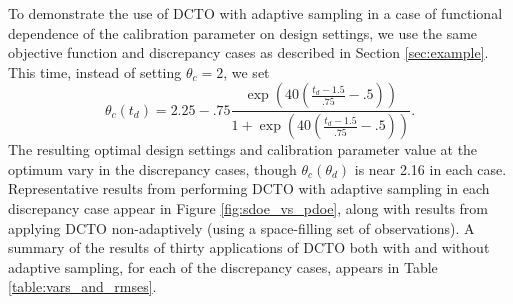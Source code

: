 \documentclass[12pt]{article}
\begin{document}
%
To demonstrate the use of DCTO with adaptive sampling in a case of functional dependence of the calibration parameter on design settings, we use the same objective function and discrepancy cases as described in Section \ref{sec:example}.
%
This time, instead of setting $\theta_c = 2$, we set 
\[\theta_c(t_d)= 2.25 - .75 \frac{ \exp\left(40\left(\frac{t_d-1.5}{.75}-.5\right)\right)} {1 + \exp\left( 40\left(\frac{t_d-1.5}{.75}-.5\right) \right)}.\]
%
The resulting optimal design settings and calibration parameter value at the optimum vary in the discrepancy cases, though $\theta_c(\theta_d)$ is near 2.16 in each case.
%
Representative results from performing DCTO with adaptive sampling in each discrepancy case appear in Figure \ref{fig:sdoe_vs_pdoe}, along with results from applying DCTO non-adaptively (using a space-filling set of observations).
%
A summary of the results of thirty applications of DCTO both with and without adaptive sampling, for each of the discrepancy cases, appears in Table \ref{table:vars_and_rmses}.
%
\end{document}
